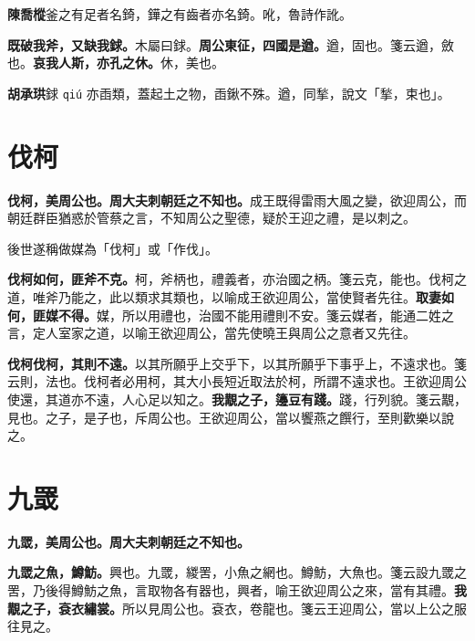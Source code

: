 \begin{quoting}\textbf{陳喬樅}釜之有足者名錡，鏵之有齒者亦名錡。吪，魯詩作訛。\end{quoting}

\textbf{既破我斧，又缺我銶。}{\footnotesize 木屬曰銶。}\textbf{周公東征，四國是遒。}{\footnotesize 遒，固也。箋云遒，斂也。}\textbf{哀我人斯，亦孔之休。}{\footnotesize 休，美也。}

\begin{quoting}\textbf{胡承珙}銶 \texttt{qiú} 亦臿類，蓋起土之物，臿鍬不殊。遒，同揫，說文「揫，束也」。\end{quoting}

\section{伐柯}


\textbf{伐柯，美周公也。周大夫刺朝廷之不知也。}{\footnotesize 成王既得雷雨大風之變，欲迎周公，而朝廷群臣猶惑於管蔡之言，不知周公之聖德，疑於王迎之禮，是以刺之。}

\begin{quoting}後世遂稱做媒為「伐柯」或「作伐」。\end{quoting}

\textbf{伐柯如何，匪斧不克。}{\footnotesize 柯，斧柄也，禮義者，亦治國之柄。箋云克，能也。伐柯之道，唯斧乃能之，此以類求其類也，以喻成王欲迎周公，當使賢者先往。}\textbf{取妻如何，匪媒不得。}{\footnotesize 媒，所以用禮也，治國不能用禮則不安。箋云媒者，能通二姓之言，定人室家之道，以喻王欲迎周公，當先使曉王與周公之意者又先往。}

\textbf{伐柯伐柯，其則不遠。}{\footnotesize 以其所願乎上交乎下，以其所願乎下事乎上，不遠求也。箋云則，法也。伐柯者必用柯，其大小長短近取法於柯，所謂不遠求也。王欲迎周公使還，其道亦不遠，人心足以知之。}\textbf{我覯之子，籩豆有踐。}{\footnotesize 踐，行列貌。箋云覯，見也。之子，是子也，斥周公也。王欲迎周公，當以饗燕之饌行，至則歡樂以說之。}

\section{九罭}


\textbf{九罭，美周公也。周大夫刺朝廷之不知也。}

\textbf{九罭之魚，鱒魴。}{\footnotesize 興也。九罭，緵罟，小魚之網也。鱒魴，大魚也。箋云設九罭之罟，乃後得鱒魴之魚，言取物各有器也，興者，喻王欲迎周公之來，當有其禮。}\textbf{我覯之子，袞衣繡裳。}{\footnotesize 所以見周公也。袞衣，卷龍也。箋云王迎周公，當以上公之服往見之。}

